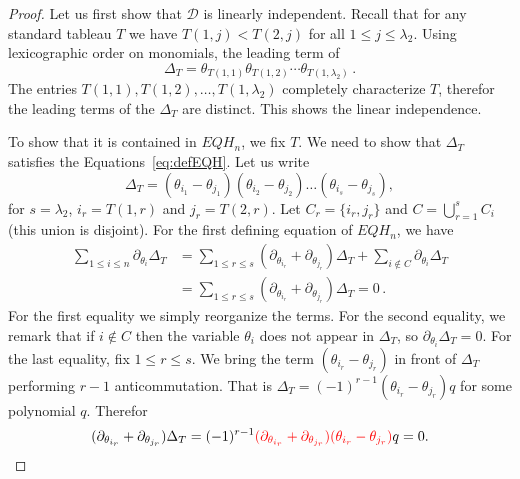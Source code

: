 \documentclass[11pt]{amsart}
\theoremstyle{definition}
\numberwithin{equation}{section}
\begin{document}
\begin{proof} Let us first show that ${\mathcal D}$ is linearly independent. Recall that for any standard tableau $T$ we have  
$T(1,j)<T(2,j)$ for all $1\le j\le \lambda_2$. Using lexicographic order on monomials, the leading term of 
  $$\Delta_T=\theta_{T(1,1)}\theta_{T(1,2)}\cdots \theta_{T(1,\lambda_2)}\,.$$
  The entries $T(1,1), T(1,2),\ldots,T(1,\lambda_2)$ completely characterize $T$, therefor the leading terms of the $\Delta_T$ are distinct.
  This shows the linear  independence.

To show that it  is  contained in $EQH_n $, we fix $T$. We need to show that $\Delta_T$ satisfies the Equations~\eqref{eq:defEQH}.
Let us write 
 $$\Delta_T=(\theta_{i_1}-\theta_{j_1})(\theta_{i_2}-\theta_{j_2})\ldots (\theta_{i_s}-\theta_{j_s}),$$
 for $s=\lambda_2$, $i_r=T(1,r)$ and $j_r=T(2,r)$. Let  $C_r=\{i_r,j_r\}$ and $C=\bigcup_{r=1}^s C_i$ (this union is disjoint).
For the first  defining equation of $EQH_n $, we have
\begin{align*}
 \sum_{1\le i\le n} \partial_{\theta_i}\Delta_T&=\sum_{1\le r\le s}  (\partial_{\theta_{i_r}}+\partial_{\theta_{j_r}})\Delta_T + \sum_{i\notin C}  \partial_{\theta_i}\Delta_T\\
 &=\sum_{1\le r\le s}  (\partial_{\theta_{i_r}}+\partial_{\theta_{j_r}})\Delta_T =0\,.
  \end{align*}
For the first equality we simply reorganize the terms. For the second equality, we remark that if $i\notin C$ then the variable $\theta_i$ does not appear in $\Delta_T$, so 
$ \partial_{\theta_i}\Delta_T=0$. For the last equality, fix $1\le r\le s$. We bring the term $(\theta_{i_r}-\theta_{j_r})$  in front  of $\Delta_T$ performing $r-1$ anticommutation. That is $\Delta_T =(-1)^{r-1}(\theta_{i_r}-\theta_{j_r}) q$ for some  polynomial $q$. Therefor
$$(\partial_{\theta_{i_r}}+\partial_{\theta_{j_r}})\Delta_T=(-1)^{r-1}
\textcolor{red}{(\partial_{\theta_{i_r}}+\partial_{\theta_{j_r}})(\theta_{i_r}-\theta_{j_r})}q =0.
$$


\end{proof}
\end{document}
